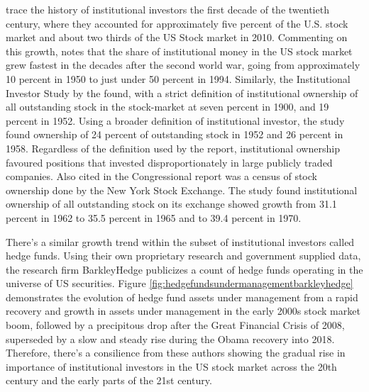 \cite{Blume2012} trace the history of institutional investors the first decade of the twentieth century, where they accounted for approximately five percent of the U.S. stock market and about two thirds of the US Stock market in 2010.  Commenting on this growth, \cite{friedmaneconomic1996} notes that the share of institutional money in the US stock market grew fastest in the decades after the second world war, going from approximately 10 percent in 1950 to just under 50 percent in 1994. Similarly, the Institutional Investor Study by the \cite{U.S.SecuritiesandExchangeCommission1971} found, with a strict definition of institutional ownership of all outstanding stock in the stock-market at seven percent in 1900, and 19 percent in 1952.  Using a broader definition of institutional investor, the study found ownership of 24 percent of outstanding stock in 1952 and 26 percent in 1958.  Regardless of the definition used by the report, institutional ownership favoured positions that invested disproportionately in large publicly traded companies.  Also cited in the Congressional report was a census of stock ownership done by the New York Stock Exchange.  The study found institutional ownership of all outstanding stock on its exchange showed growth from 31.1 percent in 1962 to 35.5 percent in 1965 and to 39.4 percent in 1970. 

There's a similar growth trend within the subset of institutional investors called hedge funds.  Using their own proprietary research and government supplied data, the research firm BarkleyHedge publicizes a count of hedge funds operating in the universe of US securities.  Figure \ref{fig:hedgefundsundermanagementbarkleyhedge} demonstrates the evolution of hedge fund assets under management from a rapid recovery and growth in assets under management in the early 2000s stock market boom, followed by a precipitous drop after the Great Financial Crisis of 2008, superseded by a slow and steady rise during the Obama recovery into 2018. Therefore, there's a consilience from these authors showing the gradual rise in importance of institutional investors in the US stock market across the 20th century and the early parts of the 21st century.  


